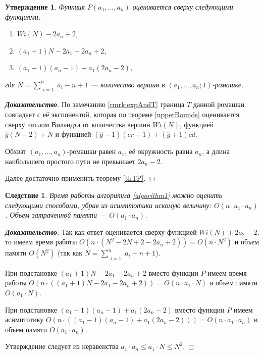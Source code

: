 \documentclass[12pt]{article}
\newtheorem{proposition}[theorem]{Утверждение}
\newtheorem{corollary}[theorem]{Следствие}
\begin{document}
\begin{proposition}
\label{upperBoundsP}
Функция $P(a_1, \dots, a_n)$ оценивается сверху следующими функциями:
\begin{enumerate}
\item $Wi(N) - 2a_n + 2$,
\item $(a_1 + 1)N - 2a_1 - 2a_n + 2$,
\item $(a_1 - 1)(a_n - 1) + a_1(2a_n - 2)$,
\end{enumerate}
где $N = \sum\limits_{\substack{i=1}}^n a_i - n + 1$ --- количество вершин в $(a_1, \dots, a_n; 1)$-ромашке.
\end{proposition}
\begin{proof}[\textbf{Доказательство}]
По замечанию \ref{rmrk:expAndT} граница $T$ данной ромашки совпадает с её экспонентой, которая по теореме \ref{upperBounds} оценивается сверху числом Виландта от количества вершин $Wi(N)$, функцией $\hat{g}(N - 2) + N$ и функцией $(\hat{g} - 1)(cr - 1) + (\hat{g} + 1) cd$.

Обхват $(a_1, \dots, a_n)$-ромашки равен $a_1$, её окружность равна $a_n$, а длина наибольшего простого пути не превышает $2a_n - 2$.

Далее достаточно применить теорему \ref{thTP}.
\end{proof}

\begin{corollary}
Время работы алгоритма \ref{algorithm1} можно оценить следующими способами, убрав из асимптотики искомую величину: $O(n \cdot a_1 \cdot a_n)$. Объем затраченной памяти --- $O(a_1 \cdot a_n)$.
\end{corollary}
\begin{proof}[\textbf{Доказательство}]
Так как ответ оценивается сверху функцией $Wi(N) + 2a_2 - 2$, то имеем время работы $O(n \cdot (N^2 - 2N + 2 - 2a_n + 2)) = O(n \cdot N^2)$ и объем памяти $O(N^2)$ (так как $N = \sum\limits_{\substack{i=1}}^n a_i - n + 1$).

При подстановке $(a_1 + 1)N - 2a_1 - 2a_n + 2$ вместо функции $P$ имеем время работы $O(n \cdot ((a_1 + 1)N - 2a_1 - 2a_n + 2)) = O(n \cdot a_1 \cdot N)$ и объем памяти $O(a_1 \cdot N)$.

При подстановке $(a_1 - 1)(a_n - 1) + a_1(2a_n - 2)$ вместо функции $P$ имеем асимптотику $O(n \cdot ((a_1 - 1)(a_n - 1) + a_1(2a_n - 2))) = O(n \cdot a_1 \cdot a_n)$ и объем памяти $O(a_1 \cdot a_n)$.

Утверждение следует из неравенства $a_1 \cdot a_n \le a_1 \cdot N \le N^2$.
\end{proof}
\end{document}
